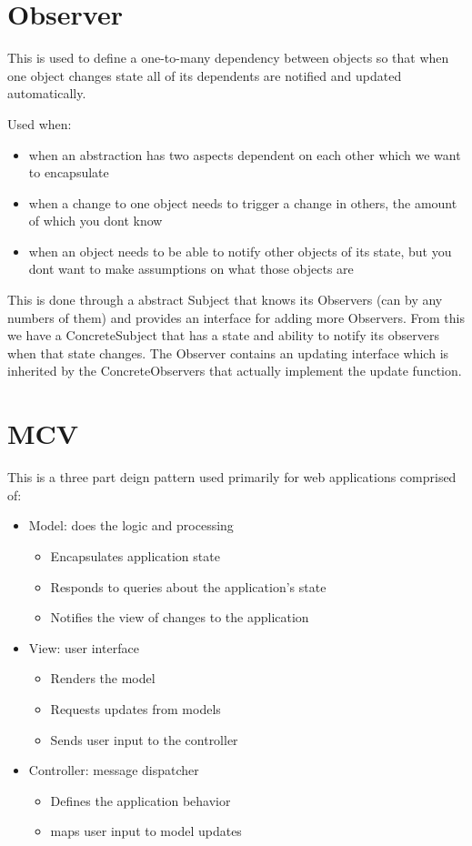 \documentclass[12pt]{article}
\begin{document}
\section*{Observer}
This is used to define a one-to-many dependency between objects so that when one object changes state all of its dependents are notified and updated automatically.

Used when:
\begin{itemize}
    \item when an abstraction has two aspects dependent on each other which we want to encapsulate
    \item when a change to one object needs to trigger a change in others, the amount of which you dont know
    \item when an object needs to be able to notify other objects of its state, but you dont want to make assumptions on what those objects are
\end{itemize}

This is done through a abstract Subject that knows its Observers (can by any numbers of them) and provides an interface for adding more Observers. From this we have a ConcreteSubject that has a state and ability to notify its observers when that state changes. The Observer contains an updating interface which is inherited by the ConcreteObservers that actually implement the update function.

\section*{MCV}
This is a three part deign pattern used primarily for web applications comprised of:
\begin{itemize}
    \item Model: does the logic and processing
        \begin{itemize}
            \item Encapsulates application state
            \item Responds to queries about the application's state
            \item Notifies the view of changes to the application
        \end{itemize}
    \item View: user interface
        \begin{itemize}
            \item Renders the model
            \item Requests updates from models
            \item Sends user input to the controller
        \end{itemize}
    \item Controller: message dispatcher
        \begin{itemize}
            \item Defines the application behavior
            \item maps user input to model updates
        \end{itemize}
\end{itemize}
\end{document}
